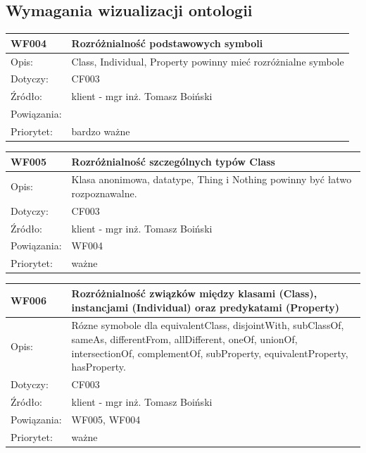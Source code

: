 \documentclass[a4paper,10pt]{article}
\begin{document}
\subsection{Wymagania wizualizacji ontologii}

\begin{tabular}{|p{3cm}|p{9cm}|} \hline

WF004 & Rozróżnialność podstawowych symboli  \\ \hline
Opis: &  Class, Individual, Property powinny mieć rozróżnialne symbole   \\ \hline
Dotyczy: &  CF003 \\ \hline
Źródło: &  klient - mgr inż. Tomasz Boiński\\ \hline
Powiązania: & \\ \hline
Priorytet: & bardzo ważne \\ \hline

\end{tabular}

\begin{tabular}{|p{3cm}|p{9cm}|} \hline

WF005 &   Rozróżnialność szczególnych typów Class\\ \hline
Opis: &   Klasa anonimowa, datatype, Thing i Nothing powinny być łatwo rozpoznawalne.  \\ \hline
Dotyczy: &  CF003 \\ \hline
Źródło: &  klient - mgr inż. Tomasz Boiński\\ \hline
Powiązania: & WF004 \\ \hline
Priorytet: &  ważne \\ \hline

\end{tabular}

\begin{tabular}{|p{3cm}|p{9cm}|} \hline

WF006 &  Rozróżnialność związków między klasami (Class), instancjami (Individual) oraz predykatami (Property)\\ \hline
Opis: & Rózne symobole dla equivalentClass, disjointWith, subClassOf, sameAs, differentFrom, allDifferent, oneOf, unionOf, intersectionOf, complementOf, subProperty, equivalentProperty, hasProperty.   \\ \hline
Dotyczy: &  CF003\\ \hline
Źródło: &  klient - mgr inż. Tomasz Boiński \\ \hline
Powiązania: & WF005, WF004 \\ \hline
Priorytet: & ważne \\ \hline

\end{tabular}
\end{document}
